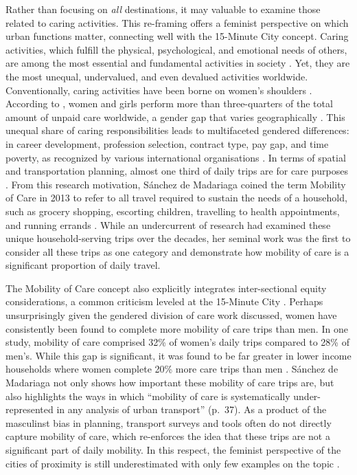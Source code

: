 \documentclass[
  authoryear,
  preprint,
  3p]{elsarticle}
\begin{document}
Rather than focusing on \emph{all} destinations, it may valuable to
examine those related to caring activities. This re-framing offers a
feminist perspective on which urban functions matter, connecting well
with the 15-Minute City concept. Caring activities, which fulfill the
physical, psychological, and emotional needs of others, are among the
most essential and fundamental activities in society
\citep{ilo_care_2018}. Yet, they are the most unequal, undervalued, and
even devalued activities worldwide. Conventionally, caring activities
have been borne on women's shoulders
\citep{haydenGrandDomesticRevolution1982, hochschild_second_2012}.
According to \citet{ilo_care_2018}, women and girls perform more than
three-quarters of the total amount of unpaid care worldwide, a gender
gap that varies geographically \citep{RN5}. This unequal share of caring
responsibilities leads to multifaceted gendered differences: in career
development, profession selection, contract type, pay gap, and time
poverty, as recognized by various international organisations
\citep{EIGE2016, ilo_care_2018}. In terms of spatial and transportation
planning, almost one third of daily trips are for care purposes
\citep{sanchezdemadariagaMobilityCareIntroducing2013, sanchezdemadariagaMeasuringMobilitiesCare2019, ravensbergen2023exploratory}.
From this research motivation, Sánchez de Madariaga coined the term
Mobility of Care in 2013 to refer to all travel required to sustain the
needs of a household, such as grocery shopping, escorting children,
travelling to health appointments, and running errands
\citep{sanchezdemadariagaMobilityCareIntroducing2013}. While an
undercurrent of research had examined these unique household-serving
trips over the decades, her seminal work was the first to consider all
these trips as one category and demonstrate how mobility of care is a
significant proportion of daily travel.

The Mobility of Care concept also explicitly integrates inter-sectional
equity considerations, a common criticism leveled at the 15-Minute City
\citep{guzmanProximityEnoughCritical2024}. Perhaps unsurprisingly given
the gendered division of care work discussed, women have consistently
been found to complete more mobility of care trips than men. In one
study, mobility of care comprised 32\% of women's daily trips compared
to 28\% of men's. While this gap is significant, it was found to be far
greater in lower income households where women complete 20\% more care
trips than men \citep{ravensbergen2023exploratory}. Sánchez de Madariaga
not only shows how important these mobility of care trips are, but also
highlights the ways in which ``mobility of care is systematically
under-represented in any analysis of urban transport'' (p.~37). As a
product of the masculinst bias in planning, transport surveys and tools
often do not directly capture mobility of care, which re-enforces the
idea that these trips are not a significant part of daily mobility. In
this respect, the feminist perspective of the cities of proximity is
still underestimated with only few examples on the topic
\citep{gil_sola_choose_2022, macintyre_her_2022}.
\end{document}
